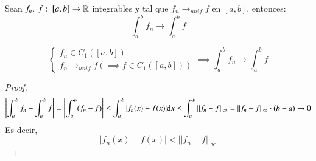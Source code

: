 \begin{pro}
    Sean $f_n,\ f :\ [a, b] \to \mathbb{R}$ integrables y tal que $f_n\to_{unif}f$ en $[a, b]$, entonces:
    $$
        \int_a^b f_n \to \int_a^b f
    $$
\end{pro}
\begin{cor}
    $$
        \begin{cases}
            f_n \in C_1([a,b])\\
            f_n \to_{unif} f (\implies f\in C_1([a, b]))
        \end{cases} \implies \int_a^b f_n \to \int_a^b f
    $$
\end{cor}
\begin{proof}
    $$
        \left|\int_a^b f_n - \int_a^b f \right| = \left|\int_a^b (f_n-f) \right|  \leq \int_a^b |f_n(x) - f(x)| \mathrm{d} x \leq \int_a^b ||f_ n - f||_\infty = ||f_n - f||_\infty \cdot (b - a) \to 0
    $$
    Es decir, $$|f_n(x) - f(x)| < ||f_n - f||_\infty$$
\end{proof}

